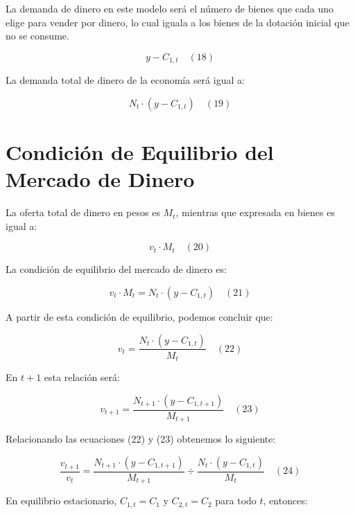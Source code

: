 \documentclass{article}
\begin{document}
La demanda de dinero en este modelo será el número de bienes que cada uno elige para vender por dinero, lo cual iguala a los bienes de la dotación inicial que no se consume.

\begin{equation}
y - C_{1,t} \quad (18)
\end{equation}

La demanda total de dinero de la economía será igual a:

\begin{equation}
N_t \cdot (y - C_{1,t}) \quad (19)
\end{equation}

\section{Condición de Equilibrio del Mercado de Dinero}

La oferta total de dinero en pesos es \( M_t \), mientras que expresada en bienes es igual a:

\begin{equation}
v_t \cdot M_t \quad (20)
\end{equation}

La condición de equilibrio del mercado de dinero es:

\begin{equation}
v_t \cdot M_t = N_t \cdot (y - C_{1,t}) \quad (21)
\end{equation}

A partir de esta condición de equilibrio, podemos concluir que:

\begin{equation}
v_t = \frac{N_t \cdot (y - C_{1,t})}{M_t} \quad (22)
\end{equation}

En \( t+1 \) esta relación será:

\begin{equation}
v_{t+1} = \frac{N_{t+1} \cdot (y - C_{1,t+1})}{M_{t+1}} \quad (23)
\end{equation}

Relacionando las ecuaciones (22) y (23) obtenemos lo siguiente:

\begin{equation}
\frac{v_{t+1}}{v_t} = \frac{N_{t+1} \cdot (y - C_{1,t+1})}{M_{t+1}} \div \frac{N_t \cdot (y - C_{1,t})}{M_t} \quad (24)
\end{equation}

En equilibrio estacionario, \( C_{1,t} = C_1 \) y \( C_{2,t} = C_2 \) para todo \( t \), entonces:
\end{document}
